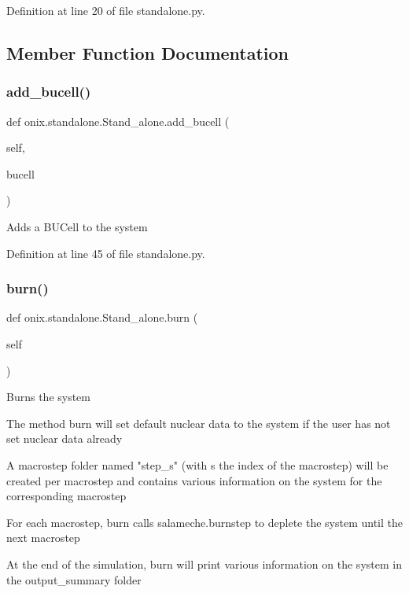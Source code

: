 Definition at line 20 of file standalone.\+py.



\subsection{Member Function Documentation}
\mbox{\label{classonix_1_1standalone_1_1Stand__alone_a3ebafe0bbcde144dcff325b1f428ef84}} 
\subsubsection{\texorpdfstring{add\+\_\+bucell()}{add\_bucell()}}
{\footnotesize\ttfamily def onix.\+standalone.\+Stand\+\_\+alone.\+add\+\_\+bucell (\begin{DoxyParamCaption}\item[{}]{self,  }\item[{}]{bucell }\end{DoxyParamCaption})}

\begin{DoxyVerb}Adds a BUCell to the system\end{DoxyVerb}
 

Definition at line 45 of file standalone.\+py.

\mbox{\label{classonix_1_1standalone_1_1Stand__alone_a1dbe96dbb003db048bb540a99d67831f}} 
\subsubsection{\texorpdfstring{burn()}{burn()}}
{\footnotesize\ttfamily def onix.\+standalone.\+Stand\+\_\+alone.\+burn (\begin{DoxyParamCaption}\item[{}]{self }\end{DoxyParamCaption})}

\begin{DoxyVerb}Burns the system

The method burn will set default nuclear data to the system if the user has not
set nuclear data already

A macrostep folder named "step_s" (with s the index of the macrostep) will be created per macrostep and
contains various information on the system for the corresponding macrostep

For each macrostep, burn calls salameche.burnstep to deplete the system until the next macrostep

At the end of the simulation, burn will print various information on the system in the output_summary folder\end{DoxyVerb}
 

